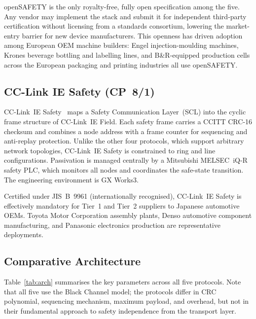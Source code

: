 \documentclass[conference]{IEEEtran}
\begin{document}
openSAFETY is the only royalty-free, fully open specification among the
five. Any vendor may implement the stack and submit it for independent
third-party certification without licensing from a standards consortium,
lowering the market-entry barrier for new device manufacturers.
This openness has driven adoption among European OEM machine builders:
Engel injection-moulding machines, Krones beverage bottling and labelling
lines, and B\&R-equipped production cells across the European packaging and
printing industries all use openSAFETY.

\subsection{CC-Link IE Safety (CP~8/1)}

CC-Link~IE Safety~\cite{IEC617843,CLPASafety} maps a Safety Communication
Layer~(SCL) into the cyclic frame structure of CC-Link~IE Field.
Each safety frame carries a CCITT CRC-16 checksum and combines a
node address with a frame counter for sequencing and anti-replay
protection. Unlike the other four protocols, which support arbitrary
network topologies, CC-Link~IE Safety is constrained to ring and line
configurations. Passivation is managed centrally by a Mitsubishi
MELSEC~iQ-R safety PLC, which monitors all nodes and coordinates the
safe-state transition. The engineering environment is GX Works3.

Certified under JIS~B~9961 (internationally recognised), CC-Link~IE
Safety is effectively mandatory for Tier~1 and Tier~2 suppliers to
Japanese automotive OEMs. Toyota Motor Corporation assembly plants,
Denso automotive component manufacturing, and Panasonic electronics
production are representative deployments.

\subsection{Comparative Architecture}

Table~\ref{tab:arch} summarises the key parameters across all five
protocols. Note that all five use the Black Channel model; the protocols
differ in CRC polynomial, sequencing mechanism, maximum payload, and
overhead, but not in their fundamental approach to safety independence
from the transport layer.
\end{document}
